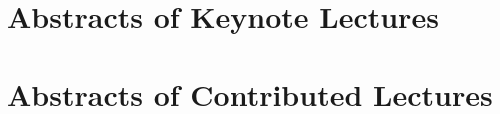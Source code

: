 \documentclass[article,A4,11pt]{llncs}%
\begin{document}
\newpage
{\ }

\tableofcontents



\part{Abstracts of Keynote Lectures}

\pagestyle{plain}

 \newpage
 \newpage
 \newpage
 \newpage
 \newpage

\part{Abstracts of Contributed Lectures}
\end{document}
